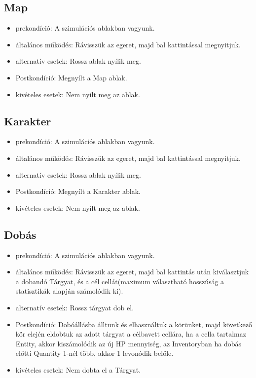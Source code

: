 \subsection{Map}

\begin{itemize}
    \item prekondíció: A szimulációs ablakban vagyunk.
    \item általános működés: Rávisszük az egeret, majd bal kattintással megnyitjuk.
    \item alternatív esetek: Rossz ablak nyílik meg.
    \item Postkondíció: Megnyílt a Map ablak.
    \item kivételes esetek: Nem nyílt meg az ablak.
\end{itemize}

\subsection{Karakter}

\begin{itemize}
    \item prekondíció: A szimulációs ablakban vagyunk.
    \item általános működés: Rávisszük az egeret, majd bal kattintással megnyitjuk.
    \item alternatív esetek: Rossz ablak nyílik meg.
    \item Postkondíció: Megnyílt a Karakter ablak.
    \item kivételes esetek: Nem nyílt meg az ablak.
\end{itemize}

\subsection{Dobás}

\begin{itemize}
    \item prekondíció: A szimulációs ablakban vagyunk.
    \item általános működés: Rávisszük az egeret, majd bal kattintás után kiválasztjuk a dobandó Tárgyat, és a cél cellát(maximum választható hosszúság a statisztikák alapján számolódik ki).
    \item alternatív esetek: Rossz tárgyat dob el.
    \item Postkondíció: Dobóállásba álltunk és elhasználtuk a körünket, majd következő kör elején eldobtuk az adott tárgyat a célbavett cellára, ha a cella tartalmaz Entity, akkor kiszámolódik az új HP mennyiség, az Inventoryban ha dobás előtti Quantity 1-nél több, akkor 1 levonódik belőle.
    \item kivételes esetek: Nem dobta el a Tárgyat.
\end{itemize}

